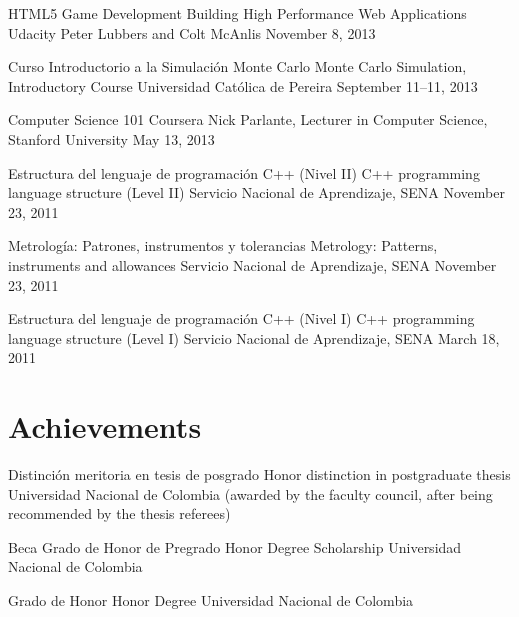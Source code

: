 \documentclass[12pt,english]{moderncv}
\begin{document}
        {HTML5 Game Development}
        {Building High Performance Web Applications}
        {Udacity}
        {Peter Lubbers and Colt McAnlis}
        {November 8, 2013}

        {Curso Introductorio a la Simulación Monte Carlo}
        {Monte Carlo Simulation, Introductory Course}
        {Universidad Católica de Pereira}
        {}
        {September 11--11, 2013}

        {Computer Science 101}
        {}
        {Coursera}
        {Nick Parlante, Lecturer in Computer Science, Stanford University}
        {May 13, 2013}

        {Estructura del lenguaje de programación C++ (Nivel II)}
        {C++ programming language structure (Level II)}
        {Servicio Nacional de Aprendizaje, SENA}
        {}
        {November 23, 2011}

        {Metrología: Patrones, instrumentos y tolerancias}
        {Metrology: Patterns, instruments and allowances}
        {Servicio Nacional de Aprendizaje, SENA}
        {}
        {November 23, 2011}

        {Estructura del lenguaje de programación C++ (Nivel I)}
        {C++ programming language structure (Level I)}
        {Servicio Nacional de Aprendizaje, SENA}
        {}
        {March 18, 2011}


\section{Achievements}

        {Distinción meritoria en tesis de posgrado}
        {Honor distinction in postgraduate thesis}
        {Universidad Nacional de Colombia}
        {}
        {(awarded by the faculty council, after being recommended by the thesis referees)}

        {Beca Grado de Honor de Pregrado}
        {Honor Degree Scholarship}
        {Universidad Nacional de Colombia}
        {}
        {}

        {Grado de Honor}
        {Honor Degree}
        {Universidad Nacional de Colombia}
        {}
        {}
\end{document}
